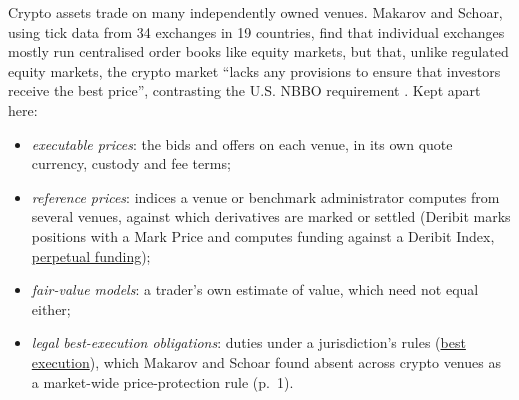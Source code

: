 \begin{qfdefinition}\label{def:crypto-venue-instrument-structure}
 Crypto assets trade on many independently owned venues. Makarov and Schoar, using tick data from 34 exchanges in 19 countries, find that individual exchanges mostly run centralised order books like equity markets, but that, unlike regulated equity markets, the crypto market ``lacks any provisions to ensure that investors receive the best price'', contrasting the U.S. NBBO requirement \citep[discussion-paper version of December 2018, pp.~1--2 and footnote~1]{s6-makarov}. Kept apart here:
\begin{itemize}
\item \emph{executable prices}: the bids and offers on each venue, in its own quote currency, custody and fee terms;
\item \emph{reference prices}: indices a venue or benchmark administrator computes from several venues, against which derivatives are marked or settled (Deribit marks positions with a Mark Price and computes funding against a Deribit Index, \hyperref[mech:perpetual-funding]{perpetual funding});
\item \emph{fair-value models}: a trader's own estimate of value, which need not equal either;
\item \emph{legal best-execution obligations}: duties under a jurisdiction's rules (\hyperref[def:best-execution]{best execution}), which Makarov and Schoar found absent across crypto venues as a market-wide price-protection rule (p.~1).
\end{itemize}


\end{qfdefinition}
